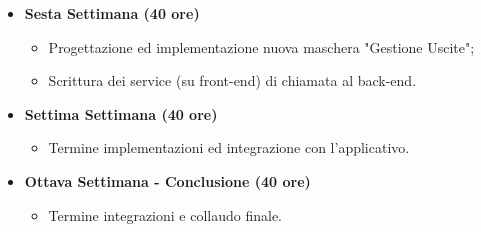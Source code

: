 {\begin{itemize}
\begin{itemize}
            \item Progettazione ed implementazione della nuova maschera di login.
        \end{itemize}
        \item \textbf{Sesta Settimana (40 ore)} 
        \begin{itemize}
            \item Progettazione ed implementazione nuova maschera "Gestione Uscite";
            \item Scrittura dei service (su front-end) di chiamata al back-end.
        \end{itemize}
        \item \textbf{Settima Settimana (40 ore)} 
        \begin{itemize}
            \item Termine implementazioni ed integrazione con l'applicativo.
        \end{itemize}
        \item \textbf{Ottava Settimana - Conclusione (40 ore)} 
        \begin{itemize}
            \item Termine integrazioni e collaudo finale.
        \end{itemize}
    \end{itemize}
}

\newcommand{\totaleOre}{320}

\newcommand{\obiettiviObbligatori}{
	 \item \underline{\textit{O01}}: primo obiettivo;
	 \item \underline{\textit{O02}}: secondo obiettivo;
	 \item \underline{\textit{O03}}: terzo obiettivo;
	 
}

\newcommand{\obiettiviDesiderabili}{
	 \item \underline{\textit{D01}}: primo obiettivo;
	 \item \underline{\textit{D02}}: secondo obiettivo;
}

\newcommand{\obiettiviFacoltativi}{
	 \item \underline{\textit{F01}}: primo obiettivo;
	 \item \underline{\textit{F02}}: secondo obiettivo;
	 \item \underline{\textit{F03}}: terzo obiettivo;
}